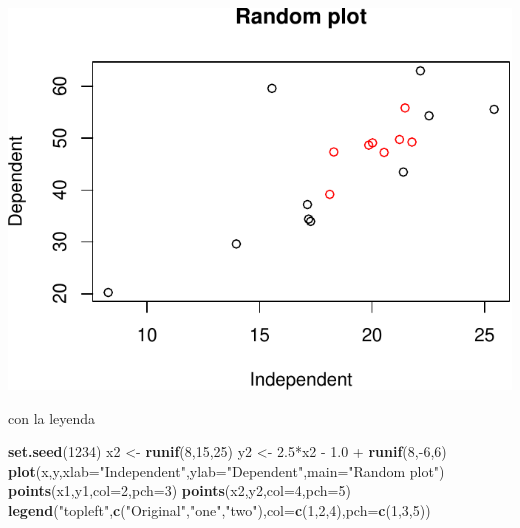 \documentclass[]{article}
\newenvironment{Shaded}{\begin{snugshade}}{\end{snugshade}}
\newcommand{\KeywordTok}[1]{\textcolor[rgb]{0.13,0.29,0.53}{\textbf{{#1}}}}
\newcommand{\DataTypeTok}[1]{\textcolor[rgb]{0.13,0.29,0.53}{{#1}}}
\newcommand{\DecValTok}[1]{\textcolor[rgb]{0.00,0.00,0.81}{{#1}}}
\newcommand{\FloatTok}[1]{\textcolor[rgb]{0.00,0.00,0.81}{{#1}}}
\newcommand{\StringTok}[1]{\textcolor[rgb]{0.31,0.60,0.02}{{#1}}}
\newcommand{\NormalTok}[1]{{#1}}
\numberwithin{equation}{section}
\begin{document}
\includegraphics{tema1_files/figure-latex/unnamed-chunk-81-1.pdf}

con la leyenda

\begin{Shaded}
\begin{Highlighting}[]
\KeywordTok{set.seed}\NormalTok{(}\DecValTok{1234}\NormalTok{)}
\NormalTok{x2 <-}\StringTok{ }\KeywordTok{runif}\NormalTok{(}\DecValTok{8}\NormalTok{,}\DecValTok{15}\NormalTok{,}\DecValTok{25}\NormalTok{)}
\NormalTok{y2 <-}\StringTok{ }\FloatTok{2.5}\NormalTok{*x2 -}\StringTok{ }\FloatTok{1.0} \NormalTok{+}\StringTok{ }\KeywordTok{runif}\NormalTok{(}\DecValTok{8}\NormalTok{,-}\DecValTok{6}\NormalTok{,}\DecValTok{6}\NormalTok{)}
 \KeywordTok{plot}\NormalTok{(x,y,}\DataTypeTok{xlab=}\StringTok{"Independent"}\NormalTok{,}\DataTypeTok{ylab=}\StringTok{"Dependent"}\NormalTok{,}\DataTypeTok{main=}\StringTok{"Random plot"}\NormalTok{)}
 \KeywordTok{points}\NormalTok{(x1,y1,}\DataTypeTok{col=}\DecValTok{2}\NormalTok{,}\DataTypeTok{pch=}\DecValTok{3}\NormalTok{)}
 \KeywordTok{points}\NormalTok{(x2,y2,}\DataTypeTok{col=}\DecValTok{4}\NormalTok{,}\DataTypeTok{pch=}\DecValTok{5}\NormalTok{)}
 \KeywordTok{legend}\NormalTok{(}\StringTok{"topleft"}\NormalTok{,}\KeywordTok{c}\NormalTok{(}\StringTok{"Original"}\NormalTok{,}\StringTok{"one"}\NormalTok{,}\StringTok{"two"}\NormalTok{),}\DataTypeTok{col=}\KeywordTok{c}\NormalTok{(}\DecValTok{1}\NormalTok{,}\DecValTok{2}\NormalTok{,}\DecValTok{4}\NormalTok{),}\DataTypeTok{pch=}\KeywordTok{c}\NormalTok{(}\DecValTok{1}\NormalTok{,}\DecValTok{3}\NormalTok{,}\DecValTok{5}\NormalTok{))}
\end{Highlighting}
\end{Shaded}
\end{document}
